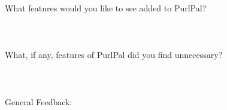 \documentclass[11pt,twocolumn]{article}
\begin{document}
{{\begin{enumerate}
      \\ \\ \\
      What features would you like to see added to PurlPal?
      \\ \\ \\ \\
      What, if any, features of PurlPal did you find unnecessary?
      \\ \\ \\ \\
      General Feedback:
      \\ \\ \\ \\
    \end{enumerate}
  }%
}
\end{document}
